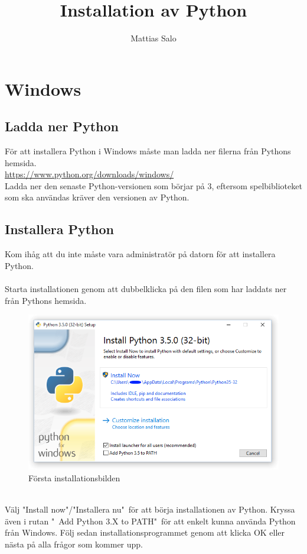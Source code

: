 \documentclass{article}
\author{Mattias Salo}
\title{Installation av Python}
\begin{document}

\maketitle
\tableofcontents

\newpage
{}

\section{Windows}
\subsection{Ladda ner Python}
För att installera Python i Windows måste man ladda ner filerna från Pythons hemsida. \\
\url{https://www.python.org/downloads/windows/}\\
Ladda ner den senaste Python-versionen som börjar på 3, eftersom spelbiblioteket som ska användas kräver den versionen av Python.\\
\subsection{Installera Python}
Kom ihåg att du inte måste vara administratör på datorn för att installera Python.\\
\\
Starta installationen genom att dubbelklicka på den filen som har laddats ner från Pythons hemsida.\\
\begin{figure}[h!]
  \includegraphics[width=\linewidth]{win_installer.png}
  \caption{Första installationsbilden}
  \label{fig:win}
\end{figure}\\
Välj "Install now"/"Installera nu"\ för att börja installationen av Python. Kryssa även i rutan "\ Add Python 3.X to PATH"\ för att enkelt kunna använda Python från Windows. Följ sedan installationsprogrammet genom att klicka OK eller nästa på alla frågor som kommer upp.
\end{document}
